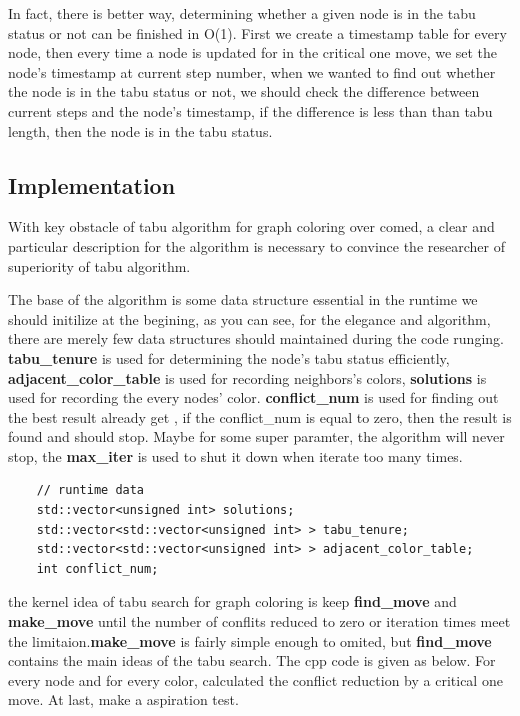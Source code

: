 \documentclass[10pt, a4paper, twocolumn]{article} %
\begin{document}
In fact, there is better way, determining whether a given node is in the tabu
status or not can be finished in O(1). First we create a timestamp table for
every node, then every time a node is updated for in the critical one move, we
set the node's timestamp at current step number, when we wanted to find out
whether the node is in the tabu status or not, we should check the difference
between current steps and the node's timestamp, if the difference is less than
than tabu length, then the node is in the tabu status.

\subsection{Implementation}
With key obstacle of tabu algorithm for graph coloring over comed, a clear and
particular description for the algorithm is necessary to convince the researcher
of superiority of tabu algorithm.

The base of the algorithm is some data structure essential in the runtime we
should initilize at the begining, as you can see, for the elegance and
algorithm, there are merely few data structures should maintained during the
code runging. \textbf{tabu\_tenure} is used for determining the node's tabu
status efficiently, \textbf{adjacent\_color\_table} is used for recording
neighbors's colors, \textbf{solutions} is used for recording the every nodes'
color. \textbf{conflict\_num} is used for finding out the best result already get
, if the conflict\_num is equal to zero, then the result is found and should
stop. Maybe for some super paramter, the algorithm will never stop, the
\textbf{max\_iter} is used to shut it down when iterate too many times.

\begin{lstlisting}
    // runtime data
    std::vector<unsigned int> solutions;
    std::vector<std::vector<unsigned int> > tabu_tenure;
    std::vector<std::vector<unsigned int> > adjacent_color_table;
    int conflict_num;
\end{lstlisting}

the kernel idea of tabu search for graph coloring is keep \textbf{find\_move}
and \textbf{make\_move} until the number of conflits reduced to zero or
iteration times meet the limitaion.\textbf{make\_move} is fairly simple enough
to omited, but \textbf{find\_move} contains the main ideas of the tabu search.
The cpp code is given as below. For every node and for every color, calculated
the conflict reduction by a critical one move. At last, make a aspiration test.
\end{document}

